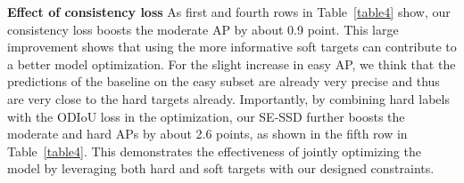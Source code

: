 \documentclass[letterpaper]{article}
\begin{document}
\begin{table}[t]
\centering
{}
\vspace*{0mm}
 \caption{Ablation study on our designed modules.
 We report the 3D average precisions of 40 sampling recall points on KITTI \textit{val.}~split for car detection.
 Cons Loss and SA-DA denote our consistency loss and shape-aware data augmentation, respectively.
 }
\label{table4}
\vspace{-1.5mm}
\end{table}



\textbf{Effect of consistency loss}
As first and fourth rows in Table~\ref{table4} show, our consistency loss boosts the moderate AP by about 0.9 point.
This large improvement shows that using the more informative soft targets can contribute to a better model optimization.
For the slight increase in easy AP, we think that the predictions of the baseline on the easy subset are already very precise and thus are very close to the hard targets already.
Importantly, by combining hard labels with the ODIoU loss in the optimization, our SE-SSD further boosts the moderate and hard APs by about 2.6 points, as shown in the fifth row in Table~\ref{table4}.
This demonstrates the effectiveness of jointly optimizing the model by leveraging both hard and soft targets with our designed constraints.
\end{document}
